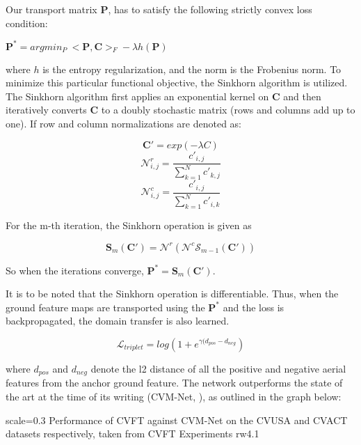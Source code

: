 Our transport matrix $\mathbf{P}$, has to satisfy the following strictly convex loss condition:

$\mathbf{P}^* = argmin_{P} \ <\mathbf{P}, \mathbf{C}>_F - \lambda h(\mathbf{P})
$

where $h$ is the entropy regularization, and the norm is the Frobenius norm. To minimize this particular functional objective, the Sinkhorn algorithm is utilized. The Sinkhorn algorithm first applies an exponential kernel on $\mathbf{C}$ and then iteratively converts $\mathbf{C}$ to a doubly stochastic matrix (rows and columns add up to one). If row and column normalizations are denoted as:

\[\mathbf{C}' = exp(-\lambda C)\]
\[\mathcal{N}^r_{i, j} = \frac{c'_{i,j}}{\sum_{k=1}^{N} c'_{k,j}} \]
\[\mathcal{N}^c_{i, j} = \frac{c'_{i,j}}{\sum_{k=1}^{N}c'_{i,k}} \]

For the m-th iteration, the Sinkhorn operation is given as 

\[\mathbf{S}_m(\mathbf{C}') = \mathcal{N}^r(\mathcal{N}^c \mathcal{S}_{m-1}(\mathbf{C}'))\]

So when the iterations converge, $\mathbf{P}^* = \mathbf{S}_m(\mathbf{C}')$.

It is to be noted that the Sinkhorn operation is differentiable. Thus, when the ground feature maps are transported using the $\mathbf{P}^*$ and the loss is backpropagated, the domain transfer is also learned.

\[\mathcal{L}_{triplet} = log(1 + e^{\gamma (d_{pos} - d_{neg}})\]

where $d_{pos}$ and $d_{neg}$ denote the l2 distance of all the positive and negative aerial features from the anchor ground feature. The network outperforms the state of the art at the time of its writing (CVM-Net, \cite{Hu2018}), as outlined in the graph below:


{scale=0.3}%
{Performance of CVFT against CVM-Net on the CVUSA and CVACT datasets respectively, taken from \cite{Shi2019}}%
{CVFT Experiments}%
{rw4.1} %







